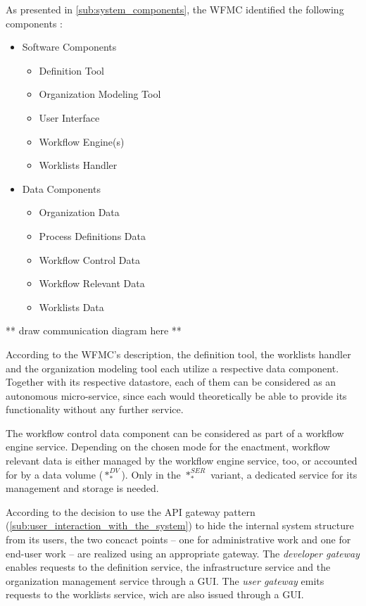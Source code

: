   As presented in \ref{sub:system_components}, the \ac{WFMC} identified the following components \cite[p.~13]{Hollingsworth1995Wfmc}:
    \begin{itemize}[nosep]
      \item Software Components
        \begin{itemize}[nosep]
          \item Definition Tool %
          \item Organization Modeling Tool %
          \item User Interface
          \item Workflow Engine(s)
          \item Worklists Handler %
        \end{itemize}
      \item Data Components
        \begin{itemize}[nosep]
          \item Organization Data %
          \item Process Definitions Data %
          \item Workflow Control Data
          \item Workflow Relevant Data %
          \item Worklists Data %
        \end{itemize}
    \end{itemize}

    ** draw communication diagram here **

  According to the \ac{WFMC}'s description, the definition tool, the worklists handler and the organization modeling tool each utilize a respective data component. Together with its respective datastore, each of them can be considered as an autonomous micro-service, since each would theoretically be able to provide its functionality without any further service.

  The workflow control data component can be considered as part of a workflow engine service.
  Depending on the chosen mode for the enactment, workflow relevant data is either managed by the workflow engine service, too, or accounted for by a data volume ($*_{*}^{DV}$). Only in the $*_{*}^{SER}$ variant, a dedicated service for its management and storage is needed.

  According to the decision to use the \ac{API} gateway pattern (\ref{sub:user_interaction_with_the_system}) to hide the internal system structure from its users, the two concact points -- one for administrative work and one for end-user work -- are realized using an appropriate gateway. The \emph{developer gateway} enables requests to the definition service, the infrastructure service and the organization management service through a \ac{GUI}. The \emph{user gateway} emits requests to the worklists service, wich are also issued through a \ac{GUI}.

